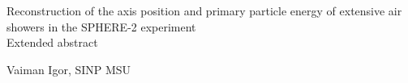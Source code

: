 \thispagestyle{empty}

\begin{center}







\begin{center}
\Huge
Reconstruction of the axis position and primary particle energy of extensive air showers in the SPHERE-2 experiment \\
\vspace{3mm}
\large
Extended abstract
\end{center}

\vspace{5mm}

Vaiman Igor, SINP MSU











\end{center}

